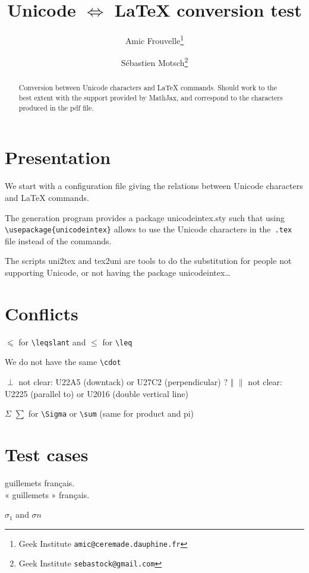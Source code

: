 \documentclass[a4paper,12pt]{article}
\title{Unicode $⇔$ \LaTeX{} conversion test}
\author{Amic Frouvelle\thanks{Geek Institute \texttt{amic@ceremade.dauphine.fr}}
\and 
Sébastien Motsch\thanks{Geek Institute \texttt{sebastock@gmail.com}}}
\date{}
\begin{document}
\maketitle
 
\begin{abstract}

Conversion between Unicode characters and \LaTeX{} commands.
Should work to the best extent with the support provided by MathJax, and correspond to the characters produced in the pdf file.

\end{abstract}

\section{Presentation}
We start with a configuration file giving the relations between Unicode characters and \LaTeX{} commands.

The generation program provides a package unicodeintex.sty such that using \verb?\usepackage{unicodeintex}? allows to use the Unicode characters in the~\verb?.tex? file instead of the commands.

The scripts uni2tex and tex2uni are tools to do the substitution for people not supporting Unicode, or not having the package unicodeintex…

\section{Conflicts}

$⩽$ for \verb?\leqslant? and  $≤$ for \verb?\leq?

We do not have the same \verb(\cdot(

$\perp$ not clear: U22A5 (downtack) or U27C2 (perpendicular) ?
$\Vert$ $\|$ not clear: U2225 (parallel to) or U2016 (double vertical line)

$Σ$ $\sum$ for \verb?\Sigma? or \verb?\sum? (same for product and pi)

\section{Test cases}
\begin{otherlanguage}{french}
\noindent \og guillemets \fg{} français.\\
« guillemets » français.\\ 
\end{otherlanguage}

$σ_1$  and  $σn$
\end{document}
